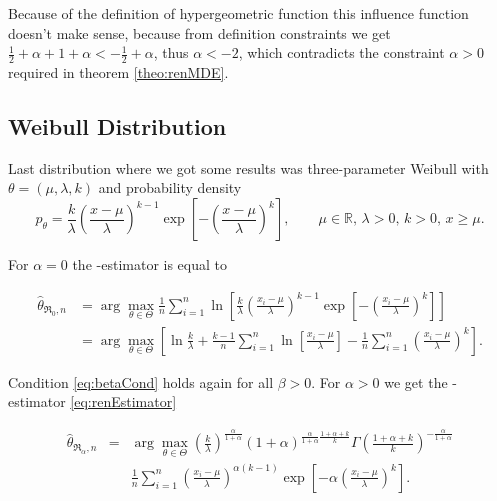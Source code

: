 \noindent Because of the definition of hypergeometric function this influence function doesn't make sense, because from definition constraints we get $\frac{1}{2}+\alpha  + 1+\alpha < -\frac{1}{2}+\alpha $, thus  $\alpha < -2$, which contradicts the constraint  $\alpha>0$ required in theorem \ref{theo:renMDE}. 

\subsection{Weibull Distribution} 

Last distribution where we got some results was three-parameter Weibull with $\theta = (\mu,\lambda,k)$ and probability density
\begin{equation}
	p_\theta =  \frac{k}{\lambda} \left( \frac{x-\mu}{\lambda} \right)^{k-1} \exp \left[ -\left( \frac{x-\mu}{\lambda} \right)^k \right], \qquad \mu \in \mathbb{R}, \, \lambda>0, \, k>0, \, x \geq \mu.
\end{equation}

\noindent For $\alpha = 0$ the \mRa-estimator is equal to

\begin{align}
	\hat{\theta}_{\mathfrak{R}_0,n} & = \arg \max_{\theta \in \Theta} \frac{1}{n} \sum^n_{i=1} \ln \left[ \frac{k}{\lambda} \left( \frac{x_i-\mu}{\lambda} \right)^{k-1} 
	\exp \left[ -\left( \frac{x_i-\mu}{\lambda} \right)^k \right]\right] \nonumber \\
	&=\arg \max_{\theta \in \Theta}\left[ \ln \frac{k}{\lambda} + \frac{k-1}{n} \sum^n_{i=1} \ln \left[  \frac{x_i-\mu}{\lambda} \right] - 
	\frac{1}{n} \sum^n_{i=1} \left(  \frac{x_i-\mu}{\lambda} \right)^k \right].
\end{align}

\noindent Condition \eqref{eq:betaCond} holds again for all $\beta>0$. For $\alpha>0$ we get the \mRa-estimator \eqref{eq:renEstimator}

\begin{eqnarray}
	\hat{\theta}_{\mathfrak{R}_\alpha,n} & = & \arg \max_{\theta \in \Theta} \left( \frac{k}{\lambda} \right)^\frac{\alpha}{1+\alpha} (1+\alpha)^{\frac{\alpha}{1+\alpha}\frac{1+\alpha+k}{k}} 
	\Gamma\left(\frac{1+\alpha+k}{k}\right)^{-\frac{\alpha}{1+\alpha}} \nonumber \\
	&& \frac{1}{n}\sum_{i=1}^n \left( \frac{x_i-\mu}{\lambda}\right)^{\alpha(k-1)} \exp\left[-\alpha \left(\frac{x_i-\mu}{\lambda}\right)^k\right].
\end{eqnarray}

